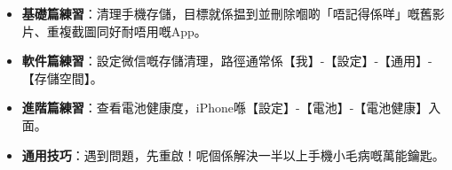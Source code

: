
\begin{itemize}
  \item \textbf{基礎篇練習}：清理手機存儲，目標就係揾到並刪除嗰啲「唔記得係咩」嘅舊影片、重複截圖同好耐唔用嘅App。
  \item \textbf{軟件篇練習}：設定微信嘅存儲清理，路徑通常係【我】-【設定】-【通用】-【存儲空間】。
  \item \textbf{進階篇練習}：查看電池健康度，iPhone喺【設定】-【電池】-【電池健康】入面。
  \item \textbf{通用技巧}：遇到問題，先重啟！呢個係解決一半以上手機小毛病嘅萬能鑰匙。
\end{itemize}
